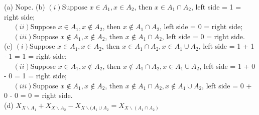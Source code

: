 \documentclass[11pt, a4paper, UTF8]{ctexart}
\begin{document}
\begin{problem}[UD: 16.22]
  
\end{problem}

\begin{solution}
  (a) Nope.
  (b) $(i)$Suppose $x \in A_{1}, x \in A_{2}$, then $x \in A_{1} \cap A_{2}$, 
  left side = 1 = right side;\\
  $~~~~~~(ii)$Suppose $x \in A_{1}, x \notin A_{2}$, then $x \notin A_{1} \cap A_{2}$, 
  left side = 0 = right side;\\
  $~~~~~~(iii)$Suppose $x \notin A_{1}, x \notin A_{2}$, then $x \notin A_{1} \cap A_{2}$, 
  left side = 0 = right side.\\
  (c) $(i)$Suppose $x \in A_{1}, x \in A_{2}$, then $x \in A_{1} \cap A_{2}, 
  x \in A_{1} \cup A_{2}$, left side = 1 + 1 - 1 = 1 = right side;\\
  $~~~~~~(ii)$Suppose $x \in A_{1}, x \notin A_{2}$, then $x \notin A_{1} \cap A_{2}, 
  x \in A_{1} \cup A_{2}$, left side = 1 + 0 - 0 = 1 = right side;\\
  $~~~~~~(iii)$Suppose $x \notin A_{1}, x \notin A_{2}$, then $x \notin A_{1} \cap A_{2}, 
  x \notin A_{1} \cup A_{2}$, left side = 0 + 0 - 0 = 0 = right side.\\
  (d) $X_{X \backslash A_{1}} + X_{X \backslash A_{2}} - X_{X \backslash (A_{1} \cup A_{2}} 
  = X_{X \backslash (A_{1} \cap A_{2})}$
\end{solution}

  



\end{document}
